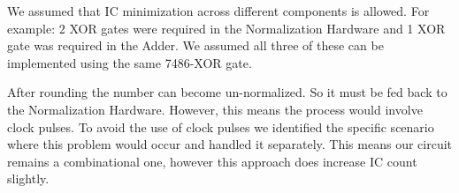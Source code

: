 \documentclass[12pt, a4paper]{article}
\begin{document}
		We assumed that IC minimization across different components is allowed.
		For example: 2 XOR gates were required in the Normalization Hardware
		and 1 XOR gate was required in the Adder. We assumed all three of these
		can be implemented using the same 7486-XOR gate.
		\newline

		After rounding the number can become un-normalized. So it must be fed
		back to the Normalization Hardware. However, this means the process
		would involve clock pulses. To avoid the use of clock pulses we
		identified the specific scenario where this problem would occur and
		handled it separately. This means our circuit remains a combinational
		one, however this approach does increase IC count slightly.
\end{document}
